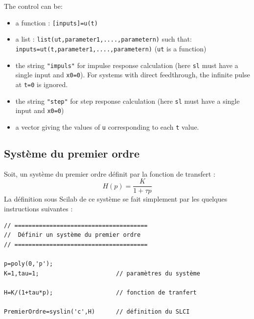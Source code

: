 \begin{doc}
\begin{itemize}
    The control can be:
    \begin{itemize}
        \item a function : \verb?[inputs]=u(t)?
        \item a list : \verb?list(ut,parameter1,....,parametern)? such that:
              \verb?inputs=ut(t,parameter1,....,parametern)? 
    (\verb?ut? is a function)
        \item the string \verb?"impuls"? for impulse response calculation 
              (here \verb?sl? must have a single input and \verb?x0=0?). 
              For systems with direct feedthrough, the infinite pulse at 
              \verb?t=0? is ignored.
        \item the string \verb?"step"? for step response calculation (here 
              \verb?sl? must have a single input and \verb?x0=0?)
        \item a vector giving the values of \verb?u? corresponding to each 
              \verb?t? value.
\end{itemize}
\end{itemize}
\end{doc}


\subsection{Système du premier ordre}
Soit, un système du premier ordre définit par la fonction de transfert : 
$$
H(p)=\dfrac{K}{1+\tau p }
$$
La définition sous Scilab de ce système se fait simplement par les quelques 
instructions suivantes :
\begin{code}
\begin{verbatim}
// ======================================
//  Définir un système du premier ordre
// ======================================

p=poly(0,'p');
K=1,tau=1;                      // paramètres du système

H=K/(1+tau*p);                  // fonction de tranfert

PremierOrdre=syslin('c',H)      // définition du SLCI
\end{verbatim}
\end{code}



